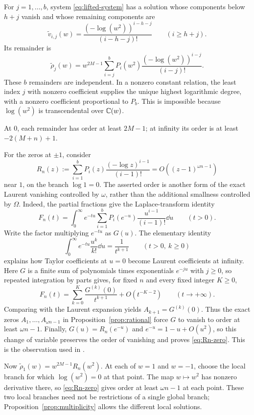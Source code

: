 For $j=1,\ldots,b$, system \eqref{eq:lifted-system} has a solution
whose components below $h+j$ vanish and whose remaining components are
\[
 \widetilde v_{i,j}(w)
     =\frac{(-\log(w^2))^{i-h-j}}{(i-h-j)!}
     \qquad(i\geq h+j).
\]
Its remainder is
\begin{equation}\label{eq:homogeneous-remainders}
 \widetilde\rho_j(w)=w^{2M-1}
       \sum_{i=j}^bP_i(w^2)
            \frac{(-\log(w^2))^{i-j}}{(i-j)!}.
\end{equation}
These $b$ remainders are independent.
In a nonzero constant relation, the least index $j$ with nonzero
coefficient supplies the unique highest logarithmic degree, with a
nonzero coefficient proportional to $P_b$.
This is impossible because $\log(w^2)$ is transcendental over $\mathbb C(w)$.

At $0$, each remainder has order at least $2M-1$; at infinity its order
is at least $-2(M+n)+1$.

For the zeros at $\pm1$, consider
\begin{equation}\label{eq:Rn-zero}
 R_n(z):=\sum_{i=1}^b P_i(z)\frac{(-\log z)^{i-1}}{(i-1)!}
       =O((z-1)^{\omega n-1})
\end{equation}
near $1$, on the branch $\log1=0$.
The asserted order is another form of the exact Laurent vanishing
controlled by $\omega$, rather than the additional smallness controlled
by $\Omega$.
Indeed, the partial fractions give the Laplace-transform identity
\[
 F_n(t)=\int_0^\infty e^{-tu}
       \sum_{i=1}^b P_i(e^{-u})\frac{u^{i-1}}{(i-1)!}\dd u
 \qquad(t>0).
\]
Write the factor multiplying $e^{-tu}$ as $G(u)$. The elementary identity
\[
 \int_0^\infty e^{-tu}\frac{u^k}{k!}\dd u=\frac1{t^{k+1}}
 \qquad(t>0,\ k\geq0)
\]
explains how Taylor coefficients at $u=0$ become Laurent coefficients
at infinity. Here $G$ is a finite sum of polynomials times exponentials
$e^{-ju}$ with $j\geq0$, so repeated integration by parts gives, for
fixed $n$ and every fixed integer $K\geq0$,
\[
 F_n(t)=\sum_{k=0}^K\frac{G^{(k)}(0)}{t^{k+1}}
             +O(t^{-K-2})\qquad(t\longrightarrow+\infty).
\]
Comparing with the Laurent expansion yields $A_{k+1}=G^{(k)}(0)$.
Thus the exact zeros $A_1,\ldots,A_{\omega n-1}$ in
Proposition~\ref{prop:rational} force $G$ to vanish to order at least
$\omega n-1$. Finally, $G(u)=R_n(e^{-u})$ and
$e^{-u}=1-u+O(u^2)$, so this change of variable preserves the order
of vanishing and proves \eqref{eq:Rn-zero}.
This is the observation used in \cite[Sections~3.5 and~4.5]{F26}.

Now $\widetilde\rho_1(w)=w^{2M-1}R_n(w^2)$.
At each of $w=1$ and $w=-1$, choose the local branch for which
$\log(w^2)=0$ at that point. The map $w\mapsto w^2$ has nonzero
derivative there, so \eqref{eq:Rn-zero} gives order at least
$\omega n-1$ at each point.
These two local branches need not be restrictions of a single global
branch; Proposition~\ref{prop:multiplicity} allows the different local
solutions.

